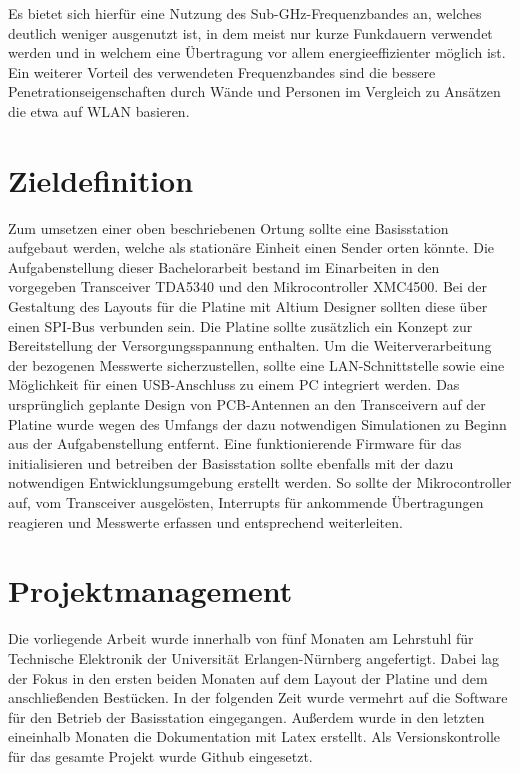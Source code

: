 Es bietet sich hierfür eine Nutzung des Sub-GHz-Frequenzbandes an, welches deutlich weniger ausgenutzt ist, in dem meist nur kurze Funkdauern verwendet werden und in welchem eine Übertragung vor allem energieeffizienter möglich ist\cite{SabolcikGHzoderSub}.
Ein weiterer Vorteil des verwendeten Frequenzbandes sind die bessere Penetrationseigenschaften durch Wände und Personen im Vergleich zu Ansätzen die etwa auf WLAN basieren.
\section{Zieldefinition}
Zum umsetzen einer oben beschriebenen Ortung sollte eine Basisstation aufgebaut werden, welche als stationäre Einheit einen Sender orten könnte.
Die Aufgabenstellung dieser Bachelorarbeit bestand im Einarbeiten in den vorgegeben Transceiver TDA5340 und den Mikrocontroller XMC4500. Bei der Gestaltung des Layouts für die Platine mit Altium Designer sollten diese über einen SPI-Bus verbunden sein. Die Platine sollte zusätzlich ein Konzept zur Bereitstellung der Versorgungsspannung enthalten. Um die Weiterverarbeitung der bezogenen Messwerte sicherzustellen, sollte eine LAN-Schnittstelle sowie eine Möglichkeit für einen USB-Anschluss zu einem PC integriert werden.
Das ursprünglich geplante Design von PCB-Antennen an den Transceivern auf der Platine wurde wegen des Umfangs der dazu  notwendigen Simulationen  zu Beginn aus der Aufgabenstellung entfernt.
Eine funktionierende Firmware für das initialisieren und betreiben der Basisstation sollte ebenfalls mit der dazu notwendigen Entwicklungsumgebung erstellt werden. So sollte der Mikrocontroller auf, vom Transceiver ausgelösten, Interrupts für ankommende Übertragungen reagieren und Messwerte erfassen und entsprechend weiterleiten.


\section{Projektmanagement}
Die vorliegende Arbeit wurde innerhalb von fünf Monaten am Lehrstuhl für Technische Elektronik der Universität Erlangen-Nürnberg angefertigt. Dabei lag der Fokus in den ersten beiden Monaten auf dem Layout der Platine und dem anschließenden Bestücken. In der folgenden Zeit wurde vermehrt auf die Software für den Betrieb der Basisstation eingegangen. Außerdem wurde in den letzten eineinhalb Monaten die Dokumentation mit Latex erstellt. Als Versionskontrolle für das gesamte Projekt wurde Github eingesetzt.
